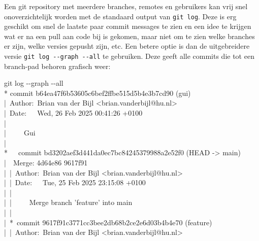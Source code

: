 \begin{aside}
Een git repository met meerdere branches, remotes en gebruikers kan vrij snel onoverzichtelijk worden met de standaard output van \texttt{git log}. Deze is erg geschikt om snel de laatste paar commit messages te zien en een idee te krijgen wat er na een pull aan code bij is gekomen, maar niet om te zien welke branches er zijn, welke versies gepusht zijn, etc. Een betere optie is dan de uitgebreidere versie \texttt{git log -\!-graph -\!-all} te gebruiken. Deze geeft alle commits die tot een branch-pad behoren grafisch weer:

\begin{bash}
\tiny{} git log -\!-graph -\!-all \\
* {\color{ttyellow}commit b64ea47f6b53605c6bef2ffbe515d5b4e3b7cd90 ({\color{ttgreen}gui})} \\
{\color{ttred}|}\ Author:\ Brian van der Bijl <brian.vanderbijl@hu.nl>   \\
{\color{ttred}|}\ Date:\ \ \ Wed, 26 Feb 2025 00:41:26 +0100    \\
{\color{ttred}|} \\
{\color{ttred}|}\ \ \ \ \ Gui \\
{\color{ttred}|} \\
*\ \ \ {\color{ttyellow}commit bd3202aef3d441da0ec7bc84245379988a2e52f0 ({\color{ttcyan}HEAD} -> {\color{ttgreen}main})} \\
{\color{ttgreen}|}{\color{ttyellow}}\ \ Merge: 4d64e86 9617f91 \\
{\color{ttgreen}|}\ {\color{ttyellow}|}\ Author:\ Brian van der Bijl <brian.vanderbijl@hu.nl>    \\
{\color{ttgreen}|}\ {\color{ttyellow}|}\ Date:\ \ \ Tue, 25 Feb 2025 23:15:08 +0100    \\
{\color{ttgreen}|}\ {\color{ttyellow}|} \\
{\color{ttgreen}|}\ {\color{ttyellow}|}\ \ \ \ \ Merge branch 'feature' into main   \\
{\color{ttgreen}|}\ {\color{ttyellow}|} \\
{\color{ttgreen}|}\ *\ {\color{ttyellow}commit 9617f91c3771cc3bee2db68b2ce2e6d03b4b4e70 ({\color{ttgreen}feature})} \\
{\color{ttgreen}|}\ {\color{ttyellow}|}\ Author:\ Brian van der Bijl <brian.vanderbijl@hu.nl> \\

\end{bash}
\end{aside}
